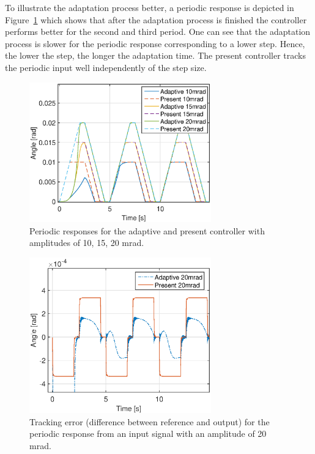 \FloatBarrier
To illustrate the adaptation process better, a periodic response is depicted in Figure~\ref{fig:periodic_resp} which shows that after the adaptation process is finished the controller performs better for the second and third period. One can see that the adaptation process is slower for the periodic response corresponding to a lower step. Hence, the lower the step, the longer the adaptation time. The present controller tracks the periodic input well independently of the step size.

\begin{figure}[h!]
  \centering
  \includegraphics[width=0.7\textwidth]{fig/matlab/periodicresponse.eps}
  \caption{\label{fig:periodic_resp} Periodic responses for the adaptive and present controller with amplitudes of 10, 15, 20 mrad.}
\end{figure}

\begin{figure}[h!]
  \centering
  \includegraphics[width=0.7\textwidth]{fig/matlab/trackingerror.eps}
  \caption{\label{fig:adapt_trackingerror} Tracking error (difference between reference and output) for the periodic response from an input signal with an amplitude of 20 mrad.}
\end{figure}

